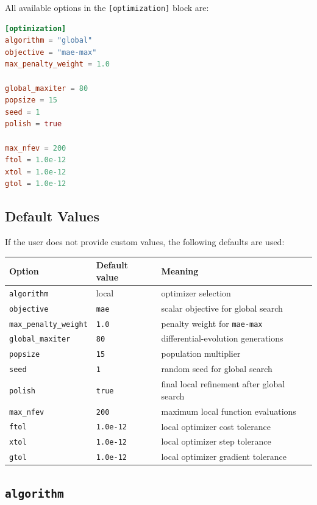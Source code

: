 \documentclass[11pt]{article}
\begin{document}
All available options in the \texttt{[optimization]} block are:

\begin{lstlisting}[language=toml]
[optimization]
algorithm = "global"
objective = "mae-max"
max_penalty_weight = 1.0

global_maxiter = 80
popsize = 15
seed = 1
polish = true

max_nfev = 200
ftol = 1.0e-12
xtol = 1.0e-12
gtol = 1.0e-12
\end{lstlisting}

\subsection{Default Values}

If the user does not provide custom values, the following defaults are used:

\begin{center}
\begin{tabular}{lll}
\toprule
Option & Default value & Meaning \\
\midrule
\texttt{algorithm} & local & optimizer selection \\
\texttt{objective} & \texttt{mae} & scalar objective for global search \\
\texttt{max\_penalty\_weight} & \texttt{1.0} & penalty weight for \texttt{mae-max} \\
\texttt{global\_maxiter} & \texttt{80} & differential-evolution generations \\
\texttt{popsize} & \texttt{15} & population multiplier \\
\texttt{seed} & \texttt{1} & random seed for global search \\
\texttt{polish} & \texttt{true} & final local refinement after global search \\
\texttt{max\_nfev} & \texttt{200} & maximum local function evaluations \\
\texttt{ftol} & \texttt{1.0e-12} & local optimizer cost tolerance \\
\texttt{xtol} & \texttt{1.0e-12} & local optimizer step tolerance \\
\texttt{gtol} & \texttt{1.0e-12} & local optimizer gradient tolerance \\
\bottomrule
\end{tabular}
\end{center}

\subsection{\texttt{algorithm}}
\end{document}

